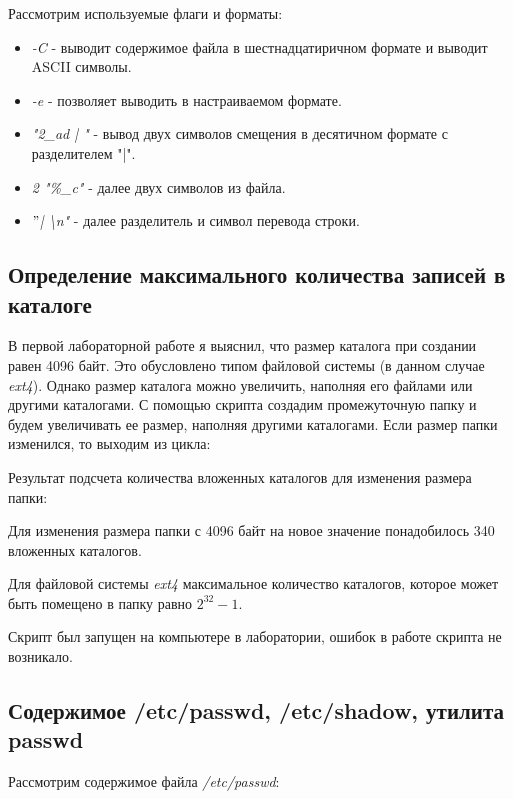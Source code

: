 \documentclass[14pt,a4paper,report]{report}
\begin{document}


Рассмотрим используемые флаги и форматы:

\begin{itemize}
	\item \emph{-C} - выводит содержимое файла в шестнадцатиричном формате и выводит ASCII символы.
	\item \emph{-e} - позволяет выводить в настраиваемом формате.
	\item \emph{"2\_ad | "} - вывод двух символов смещения в десятичном формате с разделителем "|". 
	\item \emph{2 "\%\_c"} - далее двух символов из файла. 
	\item \emph{$"$| \textbackslash n"} - далее разделитель и символ перевода строки. 
\end{itemize}

\subsection{Определение максимального количества записей в каталоге}

В первой лабораторной работе я выяснил, что размер каталога при создании равен 4096 байт. Это обусловлено типом файловой системы (в данном случае \emph{ext4}). Однако размер каталога можно увеличить, наполняя его файлами или другими каталогами. С помощью скрипта создадим промежуточную папку и будем увеличивать ее размер, наполняя другими каталогами. Если размер папки изменился, то выходим из цикла:



Результат подсчета количества вложенных каталогов для изменения размера папки:



Для изменения размера папки с 4096 байт на новое значение понадобилось 340 вложенных каталогов.

Для файловой системы \emph{ext4} максимальное количество каталогов, которое может быть помещено в папку равно $2^{32}-1$.

Скрипт был запущен на компьютере в лаборатории, ошибок в работе скрипта не возникало.

\subsection{Содержимое /etc/passwd, /etc/shadow, утилита passwd}

Рассмотрим содержимое файла \emph{/etc/passwd}:
\end{document}
